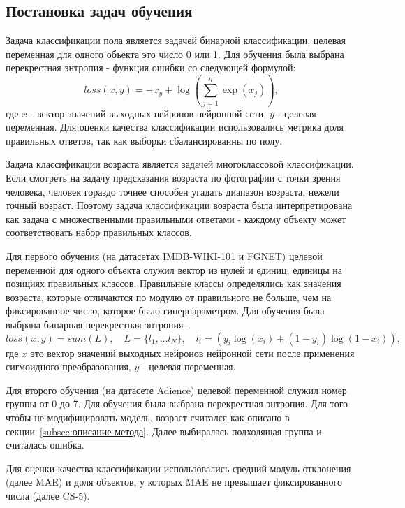 \subsection{Постановка задач обучения}\label{subsec:постановка-задач-обучения}
Задача классификации пола является задачей бинарной классификации, целевая переменная для одного объекта это число 0 или 1.
Для обучения была выбрана перекрестная энтропия - функция ошибки со следующей формулой:
\[loss(x, y) = -x_y + \log\left(\sum\limits_{j=1}^{K}\exp(x_j)\right),\] где $x$ - вектор значений выходных нейронов нейронной сети,
$y$ - целевая переменная.
Для оценки качества классификации использовались метрика доля правильных ответов, так как выборки сбалансированны по полу.
\par Задача классификации возраста является задачей многоклассовой классификации.
Если смотреть на задачу предсказания возраста по фотографии с точки зрения человека,
человек гораздо точнее способен угадать диапазон возраста, нежели точный возраст.
Поэтому задача классификации возраста была интерпретирована как задача с множественными правильными ответами -
каждому объекту может соответствовать набор правильных классов.
\par Для первого обучения (на датасетах IMDB-WIKI-101 и FGNET) целевой переменной для одного объекта служил вектор из нулей и единиц, единицы на позициях правильных классов.
Правильные классы определялись как значения возраста, которые отличаются по модулю от правильного не больше,
чем на фиксированное число, которое было гиперпараметром.
Для обучения была выбрана бинарная перекрестная энтропия -
\[loss(x, y) = sum(L), \quad L = \{l_1, \dots l_N\}, \quad l_i = \left(y_i \log(x_i) + (1 - y_i) \log(1 - x_i)\right),\]
где $x$ это вектор значений выходных нейронов нейронной сети после применения сигмоидного преобразования,
$y$ - целевая переменная.
\par Для второго обучения (на датасете Adience) целевой переменной служил номер группы от 0 до 7.
Для обучения была выбрана перекрестная энтропия.
Для того чтобы не модифицировать модель, возраст считался как описано в секции~\ref{subsec:описание-метода}.
Далее выбиралась подходящая группа и считалась ошибка.
\par Для оценки качества классификации использовались средний модуль отклонения (далее MAE)
и доля объектов, у которых MAE не превышает фиксированного числа (далее CS-5).

